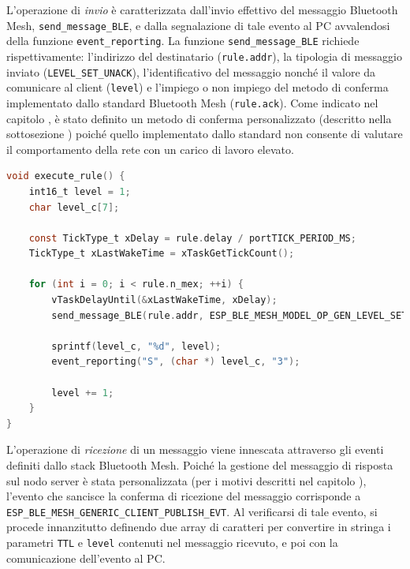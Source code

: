 \noindent L'operazione di \textit{invio} è caratterizzata dall'invio effettivo del messaggio Bluetooth Mesh, \texttt{send\_message\_BLE}, e dalla segnalazione di tale evento al PC avvalendosi della funzione \texttt{event\_reporting}. La funzione \texttt{send\_message\_BLE} richiede rispettivamente: l'indirizzo del destinatario (\texttt{rule.addr}), la tipologia di messaggio inviato (\texttt{LEVEL\_SET\_UNACK}), l'identificativo del messaggio nonché il valore da comunicare al client (\texttt{level}) e l'impiego o non impiego del metodo di conferma implementato dallo standard Bluetooth Mesh (\texttt{rule.ack}). Come indicato nel capitolo , è stato definito un metodo di conferma personalizzato (descritto nella sottosezione ) poiché quello implementato dallo standard non consente di valutare il comportamento della rete con un carico di lavoro elevato.

\begin{lstlisting}[language=C, caption= evento di invio di un messaggio Bluetooth Mesh]
void execute_rule() {
    int16_t level = 1;
    char level_c[7];

    const TickType_t xDelay = rule.delay / portTICK_PERIOD_MS;
    TickType_t xLastWakeTime = xTaskGetTickCount();

    for (int i = 0; i < rule.n_mex; ++i) {
        vTaskDelayUntil(&xLastWakeTime, xDelay);
        send_message_BLE(rule.addr, ESP_BLE_MESH_MODEL_OP_GEN_LEVEL_SET_UNACK, level);
        
        sprintf(level_c, "%d", level);
        event_reporting("S", (char *) level_c, "3");
        
        level += 1;
    }
}
\end{lstlisting}

\noindent L'operazione di \textit{ricezione} di un messaggio viene innescata attraverso gli eventi definiti dallo stack Bluetooth Mesh. Poiché la gestione del messaggio di risposta sul nodo server è stata personalizzata (per i motivi descritti nel capitolo ), l'evento che sancisce la conferma di ricezione del messaggio corrisponde a \texttt{ESP\_BLE\_MESH\_GENERIC\_CLIENT\_PUBLISH\_EVT}. Al verificarsi di tale evento, si procede innanzitutto definendo due array di caratteri per convertire in stringa i parametri \texttt{TTL} e \texttt{level} contenuti nel messaggio ricevuto, e poi con la comunicazione dell'evento al PC.


